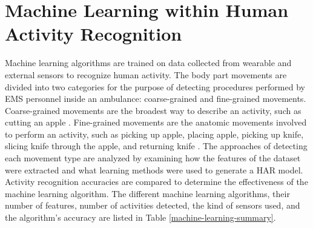 \section{Machine Learning within Human Activity Recognition}
\label{sec:Literature-Review:Machine-Learning-Classifiers}
Machine learning algorithms are trained on data collected from wearable and external sensors to recognize human activity. The body part movements are divided into two categories for the purpose of detecting procedures performed by EMS personnel inside an ambulance: coarse-grained and fine-grained movements. Coarse-grained movements are the broadest way to describe an activity, such as cutting an apple \cite{Dirk2010}. Fine-grained movements are the anatomic movements involved to perform an activity, such as picking up apple, placing apple, picking up knife, slicing knife through the apple, and returning knife \cite{Dirk2010}. The approaches of detecting each movement type are analyzed by examining how the features of the dataset were extracted and what learning methods were used to generate a HAR model. Activity recognition accuracies are compared to determine the effectiveness of the machine learning algorithm. The different machine learning algorithms, their number of features, number of activities detected, the kind of sensors used, and the algorithm's accuracy are listed in Table \ref{machine-learning-summary}.
